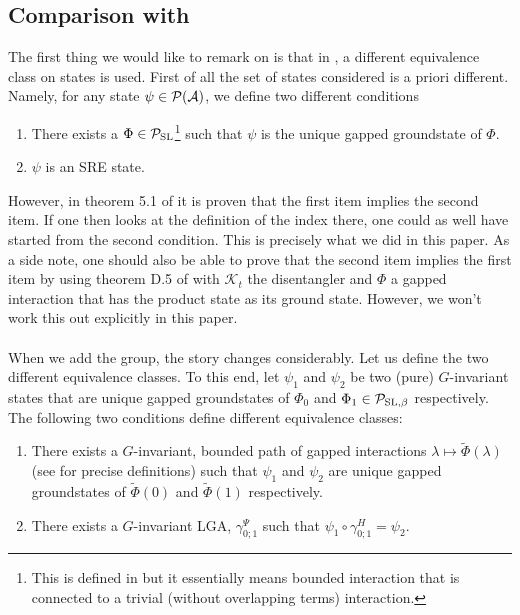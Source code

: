 \documentclass[11pt,a4paper,twoside]{article}
\numberwithin{equation}{section}
\begin{document}
	\subsection{Comparison with \cite{ogata2021h3gmathbb}}\label{sec:SomeRemarks}
	The first thing we would like to remark on is that in \cite{ogata2021h3gmathbb}, a different equivalence class on states is used. First of all the set of states considered is a priori different. Namely, for any state $\psi\in \mathcal P(\mathcal A)$, we define two different conditions
	\begin{enumerate}
		\item There exists a $\Phi\in\mathcal P_{\text{SL}}$\footnote{This is defined in \cite{ogata2021h3gmathbb} but it essentially means bounded interaction that is connected to a trivial (without overlapping terms) interaction.} such that $\psi$ is the unique gapped groundstate of $\Phi$.
		\item $\psi$ is an SRE state.
	\end{enumerate}
	However, in theorem 5.1 of \cite{ogata2021h3gmathbb} it is proven that the first item implies the second item. If one then looks at the definition of the index there, one could as well have started from the second condition. This is precisely what we did in this paper. As a side note, one should also be able to prove that the second item implies the first item by using theorem D.5 of \cite{ogata2021h3gmathbb} with $\mathcal{K}_t$ the disentangler and $\Phi$ a gapped interaction that has the product state as its ground state. However, we won't work this out explicitly in this paper.\\\\
	When we add the group, the story changes considerably. Let us define the two different equivalence classes. To this end, let $\psi_1$ and $\psi_2$ be two (pure) $G$-invariant states that are unique gapped groundstates of $\Phi_0$ and $\Phi_1\in\mathcal P_{\text{SL},\beta}$ respectively. The following two conditions define different equivalence classes:
	\begin{enumerate}
		\item There exists a $G$-invariant, bounded path of gapped interactions $\lambda\mapsto\tilde\Phi(\lambda)$ (see \cite{ogata2021h3gmathbb} for precise definitions) such that $\psi_1$ and $\psi_2$ are unique gapped groundstates of $\tilde{\Phi}(0)$ and $\tilde{\Phi}(1)$ respectively.
		\item There exists a $G$-invariant LGA, $\gamma^\Psi_{0;1}$ such that $\psi_1\circ\gamma^H_{0;1}=\psi_2$.
	\end{enumerate}
\end{document}
